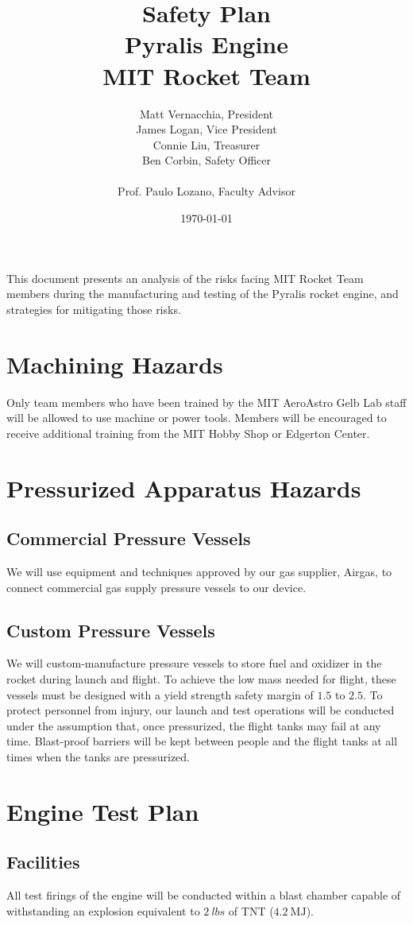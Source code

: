 \documentclass{article}
\title{Safety Plan \\ Pyralis Engine \\ MIT Rocket Team} %
\author{Matt Vernacchia, President\\James Logan, Vice President\\Connie Liu, Treasurer\\Ben Corbin, Safety Officer
\\\\ Prof. Paulo Lozano, Faculty Advisor} %
\date{ \today } %
\begin{document}
\maketitle
This document presents an analysis of the risks facing MIT Rocket Team members during the manufacturing and testing of the Pyralis rocket engine, and strategies for mitigating those risks.
\section{Machining Hazards}
Only team members who have been trained by the MIT AeroAstro Gelb Lab staff will be allowed to use machine or power tools. Members will be encouraged to receive additional training from the MIT Hobby Shop or Edgerton Center.

\section{Pressurized Apparatus Hazards}
\subsection{Commercial Pressure Vessels}
We will use equipment and techniques approved by our gas supplier, Airgas, to connect commercial gas supply pressure vessels to our device.
\subsection{Custom Pressure Vessels}
We will custom-manufacture pressure vessels to store fuel and oxidizer in the rocket during launch and flight. To achieve the low mass needed for flight, these vessels must be designed with a yield strength safety margin of $1.5$ to $2.5$. To protect personnel from injury, our launch and test operations will be conducted under the assumption that, once pressurized, the flight tanks may fail at any time. Blast-proof barriers will be kept between people and the flight tanks at all times when the tanks are pressurized.

\section{Engine Test Plan}
\subsection{Facilities}
All test firings of the engine will be conducted within a blast chamber capable of withstanding an explosion equivalent to $\SI{2}{lbs}$ of TNT ($\SI{4.2}{\mega\joule}$).
\end{document}
